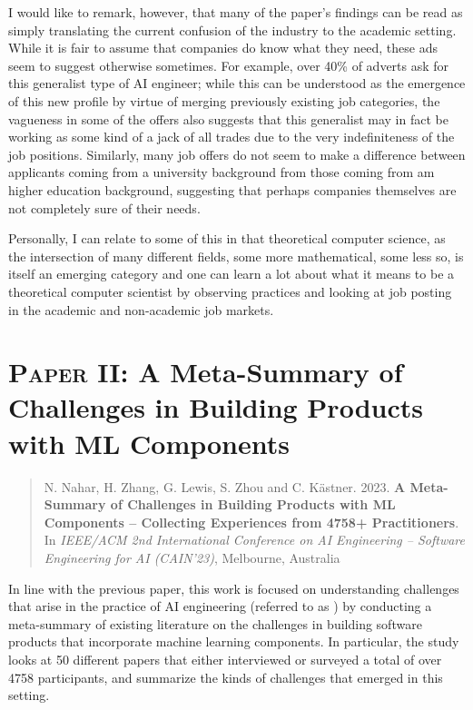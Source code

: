 I would like to remark, however, that many of the paper's findings can be read as simply translating the current confusion of the industry to the academic setting. While it is fair to assume that companies do know what they need, these ads seem to suggest otherwise sometimes. For example, over 40\% of adverts ask for this generalist type of AI engineer; while this can be understood as the emergence of this new profile by virtue of merging previously existing job categories, the vagueness in some of the offers also suggests that this generalist may in fact be working as some kind of a jack of all trades due to the very indefiniteness of the job positions. Similarly, many job offers do not seem to make a difference between applicants coming from a university background from those coming from am  higher education background, suggesting that perhaps companies themselves are not completely sure of their needs.

Personally, I can relate to some of this in that theoretical computer science, as the intersection of many different fields, some more mathematical, some less so, is itself an emerging category and one can learn a lot about what it means to be a theoretical computer scientist by observing practices and looking at job posting in the academic and non-academic job markets.
\section{\textsc{Paper II}: A Meta-Summary of Challenges in Building Products with ML Components \cite{meta}}

\begin{quote}
N. Nahar, H. Zhang, G. Lewis, S. Zhou and C. Kästner. 2023. \textbf{A Meta-Summary of Challenges in Building Products with ML Components – Collecting Experiences from 4758+ Practitioners}. In \textit{IEEE/ACM 2nd International Conference on AI Engineering – Software Engineering for AI (CAIN'23)}, Melbourne, Australia
\end{quote}

In line with the previous paper, this work is focused on understanding challenges that arise in the practice of AI engineering (referred to as ) by conducting a meta-summary of existing literature on the challenges in building software products that incorporate machine learning components. In particular, the study looks at 50 different papers that either interviewed or surveyed a total of over 4758 participants, and summarize the kinds of challenges that emerged in this setting.

